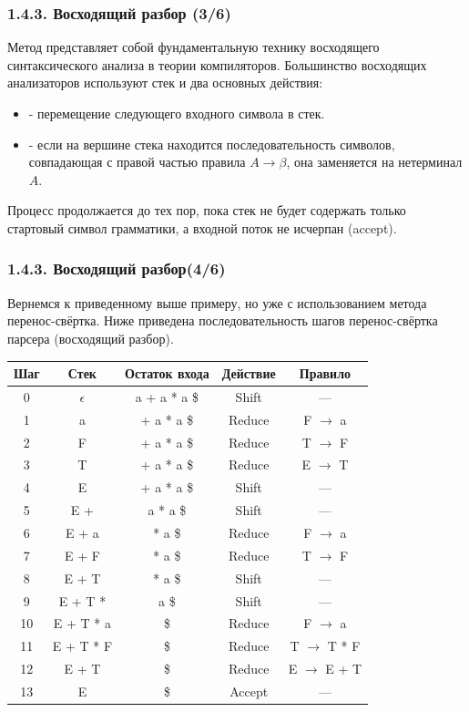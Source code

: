 \begin{frame}
\frametitle{1.4.3. Восходящий разбор (3/6)}
Метод  представляет собой фундаментальную технику восходящего синтаксического анализа в теории компиляторов. Большинство восходящих анализаторов используют стек и два основных действия:
\begin{itemize}
\item {} - перемещение следующего входного символа в стек.

\item {} - если на вершине стека находится последовательность символов, совпадающая с правой частью правила \(A\rightarrow \beta \), она заменяется на нетерминал \(A\).
\end{itemize}
Процесс продолжается до тех пор, пока стек не будет содержать только стартовый символ грамматики, а входной поток не исчерпан (accept).
\end{frame}


\begin{frame}
\frametitle{1.4.3. Восходящий разбор(4/6)}


\begin{example}
Вернемся к приведенному выше примеру, но уже с использованием метода перенос-свёртка. Ниже приведена последовательность шагов перенос-свёртка парсера (восходящий разбор).
\begin{table}[h]
\centering
\scriptsize  %
\begin{tabular}{|c|c|c|c|c|}
\hline
\textbf{Шаг} & \textbf{Стек} & \textbf{Остаток входа} & \textbf{Действие} & \textbf{Правило} \\
\hline
0  & $\epsilon$& a + a * a \$& Shift     & —                          \\
\hline
1  & a & + a * a \$ & Reduce & F $\to$ a\\
\hline
2  & F & + a * a \$ & Reduce & T $\to$ F \\
\hline
3  & T & + a * a \$ & Reduce & E $\to$ T\\
\hline
4  & E& + a * a \$& Shift & — \\
\hline
5  & E + & a * a \$ & Shift& —\\
\hline
6  & E + a & * a \$  & Reduce& F $\to$ a\\
\hline
7  & E + F & * a \$  & Reduce & T $\to$ F \\
\hline
8  & E + T & * a \$  & Shift & —  \\
\hline
9  & E + T *  & a \$ & Shift & — \\
\hline
10 & E + T * a& \$ & Reduce    & F $\to$ a \\
\hline
11 & E + T * F  & \$ & Reduce    & T $\to$ T * F\\
\hline
12 & E + T & \$ & Reduce    & E $\to$ E + T  \\
\hline
13 & E  & \$ & Accept    & —  \\
\hline
\end{tabular}
\label{tab:shift-reduce-example}
\end{table}
\end{example}
\end{frame}


